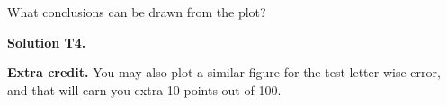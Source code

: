 \documentclass[11pt]{report}
\begin{document}
What conclusions can be drawn from the plot?

{\bf Solution T4.}

{\bf Extra credit.}
You may also plot a similar figure for the test letter-wise error, and that will earn you extra 10 points out of 100.

\end{document}

